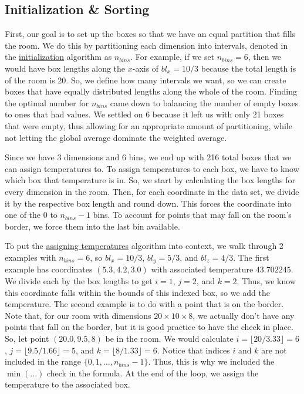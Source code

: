 \documentclass[12pt]{article}
\begin{document}
\subsection{Initialization \& Sorting}

First, our goal is to set up the boxes so that we have an equal partition that fills the room. We do this by partitioning each dimension into intervals, denoted in the \hyperref[init]{initialization} algorithm as \(n_{bins}\). For example, if we set \(n_{bins} = 6\), then we would have box lengths along the \(x\)-axis of \(bl_{x} = 10/3\) because the total length is of the room is 20. So, we define how many intervals we want, so we can create boxes that have equally distributed lengths along the whole of the room. Finding the optimal number for \(n_{bins}\) came down to balancing the number of empty boxes to ones that had values. We settled on 6 because it left us with only 21 boxes that were empty, thus allowing for an appropriate amount of partitioning, while not letting the global average dominate the weighted average. 

Since we have 3 dimensions and 6 bins, we end up with 216 total boxes that we can assign temperatures to. To assign temperatures to each box, we have to know which box that temperature is in. So, we start by calculating the box lengths for every dimension in the room. Then, for each coordinate in the data set, we divide it by the respective box length and round down. This forces the coordinate into one of the 0 to \(n_{bins} - 1\) bins. To account for points that may fall on the room's border, we force them into the last bin available.


To put the \hyperref[assign]{assigning temperatures} algorithm into context, we walk through 2 examples with \(n_{bins} = 6\), so \(bl_{x} = 10/3\), \(bl_{y} = 5/3\), and \(bl_{z} = 4/3\). The first example has coordinates \((5.3,4.2,3.0)\) with associated temperature \(43.702245\). We divide each by the box lengths to get \(i = 1\), \(j = 2\), and \(k = 2\). Thus, we know this coordinate falls within the bounds of this indexed box, so we add the temperature. The second example is to do with a point that is on the border. Note that, for our room with dimensions \(20 \times 10 \times 8\), we actually don't have any points that fall on the border, but it is good practice to have the check in place. So, let point \((20.0, 9.5, 8)\) be in the room. We would calculate \(i = \lfloor 20 / 3.33 \rfloor = 6\), \(j = \lfloor 9.5 / 1.66\rfloor = 5\), and \(k = \lfloor 8 / 1.33 \rfloor = 6\). Notice that indices \(i\) and \(k\) are not included in the range \(\{0,1, \ldots, n_{bins} - 1\}\). Thus, this is why we included the \(\min(...)\) check in the formula. At the end of the loop, we assign the temperature to the associated box.
\end{document}

